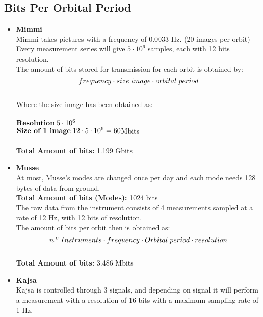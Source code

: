 \documentclass[a4paper,12pt]{article}
\begin{document}
\subsection*{Bits Per Orbital Period}
\begin{itemize}
\item{\textbf{Mimmi}}
\\
Mimmi takes pictures with a frequency of 0.0033 Hz. (20 images per orbit)
\\
Every measurement series will give $5 \cdot 10^6$ samples, each with 12 bits resolution.
\\
The amount of bits stored for transmission for each orbit is obtained by:
\\
$$ frequency \cdot size\hspace{0.1 cm}image \cdot orbital\hspace{0.1 cm} period$$
\\
Where the size image has been obtained as:
\\
\\
$\textbf{Resolution} \hspace{0.1cm} 5 \cdot 10^6$
\\
$\textbf{Size of 1 image} \hspace{0.1cm} 12 \cdot 5 \cdot 10^6 = 60$Mbits
\\
\\
\textbf{Total Amount of bits:} 1.199 Gbits
\\
\item{\textbf{Musse}}
\\
At most, Musse's modes are changed once per day and each mode needs 128 bytes of data from ground.
\\
\textbf{Total Amount of bits (Modes):} 1024 bits
\\
The raw data from the instrument consists of 4 measurements sampled at a rate of 12 Hz, with 12 bits of resolution.
\\
The amount of bits per orbit then is obtained as:
\\
$$n.^o \hspace{0.1 cm} Instruments \cdot frequency \cdot Orbital \hspace{0.1 cm} period \cdot resolution$$
\\
\textbf{Total Amount of bits:} 3.486 Mbits
\\
\item{\textbf{Kajsa}}
\\
Kajsa is controlled through 3 signals, and depending on signal it will perform a measurement with a resolution of 16 bits with a maximum sampling rate of 1 Hz.

\end{itemize}
\end{document}
